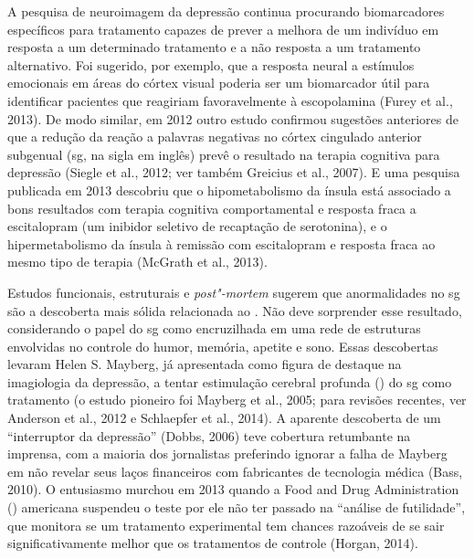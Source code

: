 A pesquisa de neuroimagem da depressão continua procurando biomarcadores
específicos para tratamento capazes de prever a melhora de um indivíduo
em resposta a um determinado tratamento e a não resposta a um tratamento
alternativo. Foi sugerido, por exemplo, que a resposta neural a
estímulos emocionais em áreas do córtex visual poderia ser um
biomarcador útil para identificar pacientes que reagiriam favoravelmente
à escopolamina (Furey et al., 2013). De modo similar, em 2012 outro
estudo confirmou sugestões anteriores de que a redução da reação a
palavras negativas no córtex cingulado anterior subgenual (sg, na
sigla em inglês) prevê o resultado na terapia cognitiva para depressão
(Siegle et al., 2012; ver também Greicius et al., 2007). E uma pesquisa
publicada em 2013 descobriu que o hipometabolismo da ínsula está
associado a bons resultados com terapia cognitiva comportamental e
resposta fraca a escitalopram (um inibidor seletivo de recaptação de
serotonina), e o hipermetabolismo da ínsula à remissão com escitalopram
e resposta fraca ao mesmo tipo de terapia (McGrath et al., 2013).

Estudos funcionais, estruturais e \emph{post"-mortem} sugerem que
anormalidades no sg são a descoberta mais sólida relacionada ao .
Não deve sorprender esse resultado, considerando o papel do sg como
encruzilhada em uma rede de estruturas envolvidas no controle do humor,
memória, apetite e sono. Essas descobertas levaram Helen S. Mayberg, já
apresentada como figura de destaque na imagiologia da depressão, a
tentar estimulação cerebral profunda () do sg como tratamento (o
estudo pioneiro foi Mayberg et al., 2005; para revisões recentes, ver
Anderson et al., 2012 e Schlaepfer et al., 2014). A aparente descoberta
de um ``interruptor da depressão'' (Dobbs, 2006) teve cobertura
retumbante na imprensa, com a maioria dos jornalistas preferindo ignorar
a falha de Mayberg em não revelar seus laços financeiros com fabricantes
de tecnologia médica (Bass, 2010). O entusiasmo murchou em 2013 quando a
Food and Drug Administration () americana suspendeu o teste por ele
não ter passado na ``análise de futilidade'', que monitora se um
tratamento experimental tem chances razoáveis de se sair
significativamente melhor que os tratamentos de controle (Horgan, 2014).

